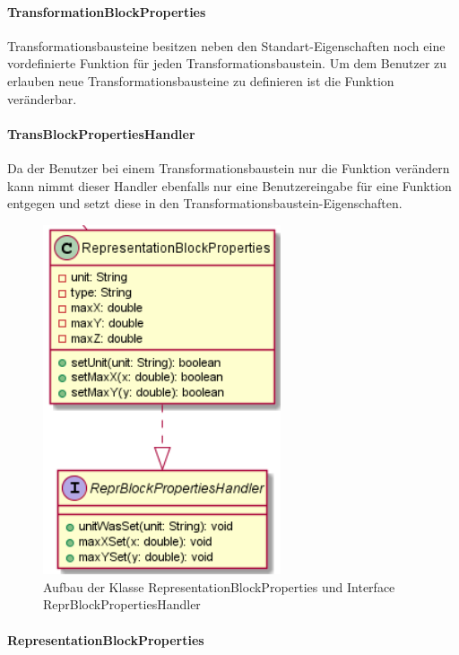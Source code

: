 \documentclass[parskip=full]{scrartcl}
\begin{document}
\paragraph{TransformationBlockProperties}

Transformationsbausteine besitzen neben den Standart-Eigenschaften noch eine vordefinierte Funktion für jeden Transformationsbaustein. Um dem Benutzer zu erlauben neue Transformationsbausteine zu definieren ist die Funktion veränderbar.

\paragraph{TransBlockPropertiesHandler}

Da der Benutzer bei einem Transformationsbaustein nur die Funktion verändern kann nimmt dieser Handler ebenfalls nur eine Benutzereingabe für eine Funktion entgegen und setzt diese in den Transformationsbaustein-Eigenschaften.

\begin{figure}[htbp]
	\begin{center}
		\includegraphics[width = 7cm]{Grafiken/View/RepresentationBlockProperties.png}
		\caption{Aufbau der Klasse RepresentationBlockProperties und Interface ReprBlockPropertiesHandler}
		\label{RepresentationBlockProperties}
	\end{center}
\end{figure}

\paragraph{RepresentationBlockProperties}
\end{document}
